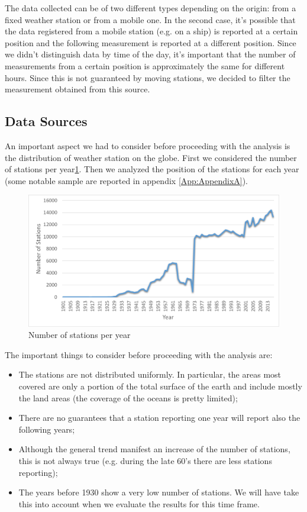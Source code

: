 \documentclass{vldb}
\begin{document}
The data collected can be of two different types depending on the origin: from a fixed weather station or from a mobile one. In the second case, it's possible that the data registered from a mobile station (e.g. on a ship) is reported at a certain position and the following measurement is reported at a different position. Since we didn't distinguish data by time of the day, it's important that the number of measurements from a certain position is approximately the same for different hours. Since this is not guaranteed by moving stations, we decided to filter the measurement obtained from this source. \\

\subsection{Data Sources}
An important aspect we had to consider before proceeding with the analysis is the distribution of weather station on the globe. First we considered the number of stations per year\ref{fig:stations}. Then we analyzed the position of the stations for each year (some notable sample are reported in appendix \ref{App:AppendixA}). 

\begin{figure}[tbh]
\includegraphics[width=1\linewidth]{stations}
\caption{Number of stations per year}
\label{fig:stations}
\end{figure}

The important things to consider before proceeding with the analysis are:
\begin{itemize}
    \item The stations are not distributed uniformly. In particular, the areas most covered are only a portion of the total surface of the earth and include mostly the land areas (the coverage of the oceans is pretty limited);
    \item There are no guarantees that a station reporting one year will report also the following years;
    \item Although the general trend manifest an increase of the number of stations, this is not always true (e.g. during the late 60's there are less stations reporting);
    \item The years before 1930 show a very low number of stations. We will have take this into account when we evaluate the results for this time frame.
\end{itemize}
\end{document}
